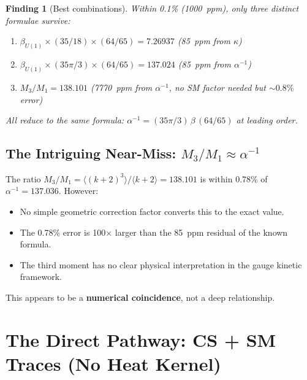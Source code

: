 \documentclass[12pt,a4paper]{article}
\newtheorem{finding}{Finding}
\theoremstyle{definition}
\theoremstyle{remark}
\begin{document}
\begin{finding}[Best combinations]
\label{find:best}
Within 0.1\% (1000~ppm), only three distinct formulae survive:
\begin{enumerate}
\item $\beta_{U(1)} \times (35/18) \times (64/65) = 7.26937$
  \quad(85~ppm from $\kappa$)
\item $\beta_{U(1)} \times (35\pi/3) \times (64/65) = 137.024$
  \quad(85~ppm from $\alpha^{-1}$)
\item $M_3/M_1 = 138.101$ \quad(7770~ppm from $\alpha^{-1}$, no SM factor needed
  but $\sim 0.8\%$ error)
\end{enumerate}
All reduce to the same formula: $\alpha^{-1} = (35\pi/3)\,\beta\,(64/65)$
at leading order.
\end{finding}

\subsection{The Intriguing Near-Miss: $M_3/M_1 \approx \alpha^{-1}$}

The ratio $M_3/M_1 = \langle (k+2)^3 \rangle / \langle k+2 \rangle = 138.101$
is within 0.78\% of $\alpha^{-1} = 137.036$.  However:
\begin{itemize}
\item No simple geometric correction factor converts this to the exact value.
\item The 0.78\% error is 100$\times$ larger than the 85~ppm residual of
  the known formula.
\item The third moment has no clear physical interpretation in the gauge
  kinetic framework.
\end{itemize}

This appears to be a \textbf{numerical coincidence}, not a deep relationship.

\section{The Direct Pathway: CS + SM Traces (No Heat Kernel)}
\label{sec:direct}
\end{document}
